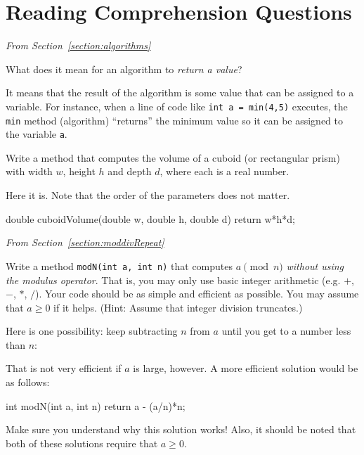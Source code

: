 \section{Reading Comprehension Questions}

\noindent
{\em From Section~\ref{section:algorithms}}

\begin{requ}
What does it mean for an algorithm to {\em return a value}?
\begin{requanswer}
It means that the result of the algorithm is some value that can be assigned to a variable.
For instance, when a line of code like \verb+int a = min(4,5)+ executes, 
the \verb+min+ method (algorithm) ``returns'' the minimum value so it can be assigned to 
the variable \verb+a+.
\end{requanswer}
\end{requ}

\begin{requ}
Write a method that computes the volume of a cuboid 
(or rectangular prism)
with width $w$, height $h$ and depth $d$, where each is a real number.
\begin{requanswer}
Here it is. Note that the order of the parameters does not matter.
\begin{code}
double cuboidVolume(double w, double h, double d) {
    return w*h*d;
}
\end{code}
\end{requanswer}
\end{requ}


\medskip 

\noindent
{\em From Section~\ref{section:moddivRepeat}}

\begin{requ}
Write a method \verb+modN(int a, int n)+ that computes $a\pmod n$ 
{\em without using the modulus operator}. That is, you may only use basic integer arithmetic
(e.g. $+$, $-$, $*$, $/$).
Your code should be as simple and efficient as possible.
You may assume that $a\geq 0$ if it helps.
(Hint: Assume that integer division truncates.) 
\begin{requanswer}
Here is one possibility: keep subtracting $n$ from $a$
until you get to a number less than $n$:
\begin{code}
int modN(int a, int n) {
    while(a>=n) {
        a=a-n;
    return a;
}
\end{code}
That is not very efficient if $a$ is large, however. 
A more efficient solution would be as follows:
\begin{code}
int modN(int a, int n) {
    return a - (a/n)*n;
}
\end{code}
Make sure you understand why this solution works!
Also, it should be noted that both of these solutions require that $a\geq 0$.
\end{requanswer}
\end{requ}

